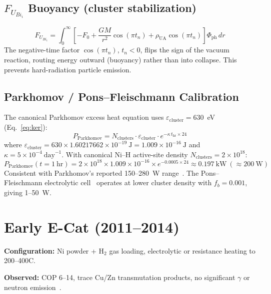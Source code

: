 \documentclass[11pt,a4paper]{article}
\begin{document}
\subsection{$F_{U_{Bi_i}}$ Buoyancy (cluster stabilization)}
\begin{equation}\label{eq:fubi}
F_{U_{Bi_i}}=\int_0^\infty\left[-F_0+\frac{GM}{r^2}\cos(\pi t_n)
  +\rho_{\text{UA}}\cos(\pi t_n)\right]\Phi_{\text{ph}}\,dr
\end{equation}
The negative-time factor $\cos(\pi t_n)$, $t_n<0$, flips the sign of the vacuum
reaction, routing energy outward (buoyancy) rather than into collapse. This
prevents hard-radiation particle emission.

\subsection{Parkhomov / Pons--Fleischmann Calibration}
The canonical Parkhomov excess heat equation uses
$\varepsilon_{\text{cluster}}=630$~eV (Eq.~\eqref{eq:ker}):
\begin{equation}\label{eq:parkhomov}
P_{\text{Parkhomov}} = N_{\text{clusters}}\cdot\varepsilon_{\text{cluster}}
                       \cdot e^{-\kappa\,t_{\text{hr}}\times24}
\end{equation}
where $\varepsilon_{\text{cluster}}=630\times1.60217662\times10^{-19}\ \text{J}
=1.009\times10^{-16}\ \text{J}$ and $\kappa=5\times10^{-4}\ \text{day}^{-1}$.
With canonical Ni--H active-site density $N_{\text{clusters}}=2\times10^{18}$:
\begin{equation}\label{eq:parkhomov_num}
P_{\text{Parkhomov}}(t=1\ \text{hr})
  =2\times10^{18}\times1.009\times10^{-16}\times e^{-0.0005\times24}
  \approx0.197\ \text{kW}\ (\approx200\ \text{W})
\end{equation}
Consistent with Parkhomov's reported 150--280~W
range~\cite{parkhomov2015,parkhomov2016}. The Pons--Fleischmann electrolytic
cell~\cite{fleischmann1989} operates at lower cluster density with $f_b=0.001$,
giving 1--50~W.

\section{Early E-Cat (2011--2014)}

\textbf{Configuration:} Ni powder + H$_2$ gas loading, electrolytic or resistance
heating to 200--400\textdegree C.

\textbf{Observed:} COP 6--14, trace Cu/Zn transmutation products, no significant
$\gamma$ or neutron emission~\cite{levi2013,levi2014}.
\end{document}
